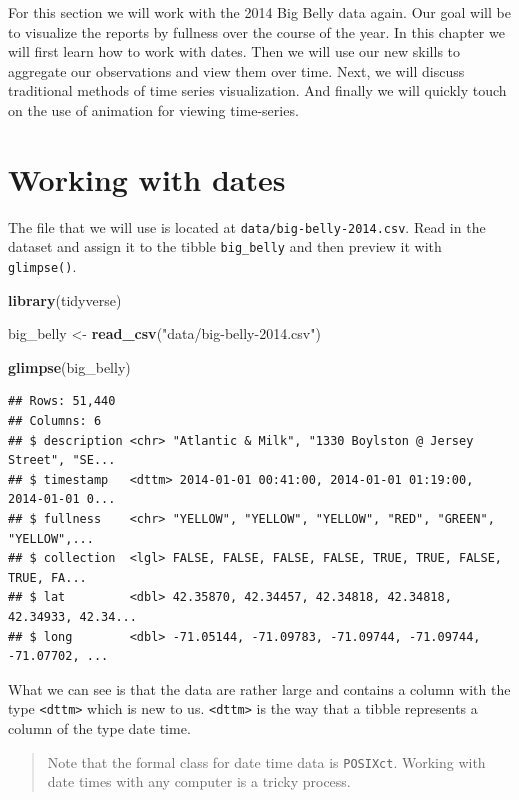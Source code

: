 \documentclass[
]{book}
\newenvironment{Shaded}{\begin{snugshade}}{\end{snugshade}}
\newcommand{\KeywordTok}[1]{\textcolor[rgb]{0.13,0.29,0.53}{\textbf{#1}}}
\newcommand{\NormalTok}[1]{#1}
\newcommand{\StringTok}[1]{\textcolor[rgb]{0.31,0.60,0.02}{#1}}
\begin{document}
For this section we will work with the 2014 Big Belly data again. Our goal will be to visualize the reports by fullness over the course of the year. In this chapter we will first learn how to work with dates. Then we will use our new skills to aggregate our observations and view them over time. Next, we will discuss traditional methods of time series visualization. And finally we will quickly touch on the use of animation for viewing time-series.

\hypertarget{working-with-dates}{%
\section{Working with dates}\label{working-with-dates}}

The file that we will use is located at \texttt{data/big-belly-2014.csv}. Read in the dataset and assign it to the tibble \texttt{big\_belly} and then preview it with \texttt{glimpse()}.

\begin{Shaded}
\begin{Highlighting}[]
\KeywordTok{library}\NormalTok{(tidyverse)}

\NormalTok{big\_belly \textless{}{-}}\StringTok{ }\KeywordTok{read\_csv}\NormalTok{(}\StringTok{"data/big{-}belly{-}2014.csv"}\NormalTok{)}

\KeywordTok{glimpse}\NormalTok{(big\_belly)}
\end{Highlighting}
\end{Shaded}

\begin{verbatim}
## Rows: 51,440
## Columns: 6
## $ description <chr> "Atlantic & Milk", "1330 Boylston @ Jersey Street", "SE...
## $ timestamp   <dttm> 2014-01-01 00:41:00, 2014-01-01 01:19:00, 2014-01-01 0...
## $ fullness    <chr> "YELLOW", "YELLOW", "YELLOW", "RED", "GREEN", "YELLOW",...
## $ collection  <lgl> FALSE, FALSE, FALSE, FALSE, TRUE, TRUE, FALSE, TRUE, FA...
## $ lat         <dbl> 42.35870, 42.34457, 42.34818, 42.34818, 42.34933, 42.34...
## $ long        <dbl> -71.05144, -71.09783, -71.09744, -71.09744, -71.07702, ...
\end{verbatim}

What we can see is that the data are rather large and contains a column with the type \texttt{\textless{}dttm\textgreater{}} which is new to us. \texttt{\textless{}dttm\textgreater{}} is the way that a tibble represents a column of the type date time.

\begin{quote}
Note that the formal class for date time data is \texttt{POSIXct}. Working with date times with any computer is a tricky process.
\end{quote}
\end{document}
